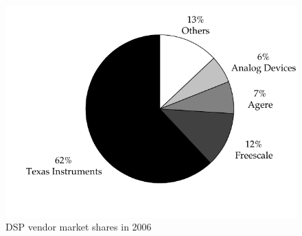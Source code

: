 
\begin{figure}[htb]
	\centering
		\includegraphics[scale = 0.95]{../kapitel02/figures/dsp_market_share.pdf}
	\caption{DSP vendor market shares in 2006 \cite{strauss_dsp_market}}
	\label{fig:dsp_market_share}
\end{figure}

